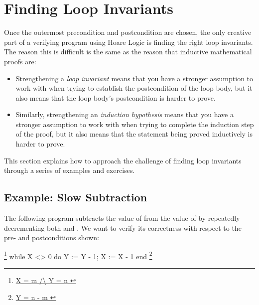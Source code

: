 \documentclass[12pt]{report}
\begin{document}
\section{Finding Loop Invariants}



 Once the outermost precondition and postcondition are
    chosen, the only creative part of a verifying program using Hoare
    Logic is finding the right loop invariants.  The reason this is
    difficult is the same as the reason that inductive mathematical
    proofs are:



\begin{itemize}
\item  Strengthening a \textit{loop invariant} means that you have a stronger
      assumption to work with when trying to establish the
      postcondition of the loop body, but it also means that the loop
      body's postcondition is harder to prove.



\item  Similarly, strengthening an \textit{induction hypothesis} means that
      you have a stronger assumption to work with when trying to
      complete the induction step of the proof, but it also means that
      the statement being proved inductively is harder to prove.

\end{itemize}


    This section explains how to approach the challenge of finding
    loop invariants through a series of examples and exercises. 
\begin{coqdoccode}
\coqdocemptyline
\end{coqdoccode}
\subsection{Example: Slow Subtraction}



 The following program subtracts the value of  from the value of
     by repeatedly decrementing both  and .  We want to verify its
    correctness with respect to the pre- and postconditions shown:


           \footnote{\url{ X = m /\ Y = n }}
             while X <> 0 do
               Y := Y - 1;
               X := X - 1
             end
           \footnote{\url{ Y = n - m }}
\end{document}
